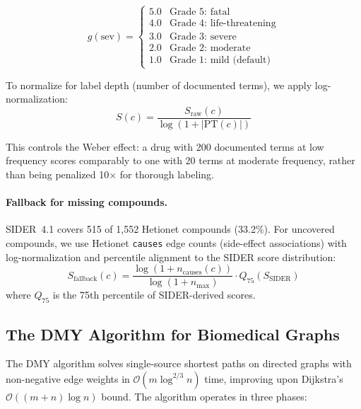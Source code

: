 \documentclass[11pt,a4paper]{article}
\newcommand{\BigO}[1]{\mathcal{O}(#1)}
\begin{document}
\begin{equation}
    g(\text{sev}) = \begin{cases}
        5.0 & \text{Grade 5: fatal} \\
        4.0 & \text{Grade 4: life-threatening} \\
        3.0 & \text{Grade 3: severe} \\
        2.0 & \text{Grade 2: moderate} \\
        1.0 & \text{Grade 1: mild (default)}
    \end{cases}
    \label{eq:ctcae}
\end{equation}

To normalize for label depth (number of documented terms), we apply
log-normalization:
\begin{equation}
    S(c) = \frac{S_\text{raw}(c)}{\log(1 + |\text{PT}(c)|)}
    \label{eq:safety_norm}
\end{equation}

This controls the Weber effect: a drug with 200 documented terms at low
frequency scores comparably to one with 20 terms at moderate frequency,
rather than being penalized 10$\times$ for thorough labeling.

\paragraph{Fallback for missing compounds.}
SIDER~4.1 covers 515 of 1,552 Hetionet compounds (33.2\%). For
uncovered compounds, we use Hetionet \texttt{causes} edge counts
(side-effect associations) with log-normalization and percentile
alignment to the SIDER score distribution:
\begin{equation}
    S_\text{fallback}(c) = \frac{\log(1 + n_\text{causes}(c))}
    {\log(1 + n_\text{max})} \cdot Q_{75}(S_\text{SIDER})
    \label{eq:fallback}
\end{equation}
where $Q_{75}$ is the 75th percentile of SIDER-derived scores.

\subsection{The DMY Algorithm for Biomedical Graphs}
\label{sec:methods:dmy}

The DMY algorithm \citep{duan2025sssp} solves single-source shortest
paths on directed graphs with non-negative edge weights in
$\BigO{m \log^{2/3} n}$ time, improving upon Dijkstra's
$\BigO{(m + n) \log n}$ bound. The algorithm operates in three phases:
\end{document}
